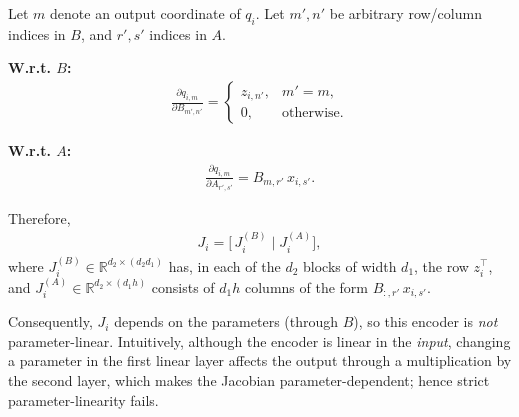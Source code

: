 Let $m$ denote an output coordinate of $q_i$. Let $m',n'$ be arbitrary row/column indices in $B$, and $r',s'$ indices in $A$.

\textbf{W.r.t. $B$:}
\begin{align}
\frac{\partial q_{i,m}}{\partial B_{m',n'}} 
= \begin{cases} z_{i,n'}, & m' = m, \\ 0, & \text{otherwise.} \end{cases}
\end{align}

\textbf{W.r.t. $A$:}
\begin{align}
\frac{\partial q_{i,m}}{\partial A_{r',s'}} = B_{m,r'}\,x_{i,s'} .
\end{align}

Therefore,
\begin{align}
J_i = \bigl[\, J^{(B)}_i \;\big|\; J^{(A)}_i \bigr],
\end{align}
where $J^{(B)}_i\in\mathbb{R}^{d_2\times(d_2 d_1)}$ has, in each of the $d_2$ blocks of width $d_1$, the row $z_i^{\!\top}$, and $J^{(A)}_i\in\mathbb{R}^{d_2\times(d_1 h)}$ consists of $d_1 h$ columns of the form $B_{:,r'}\,x_{i,s'}$.

Consequently, $J_i$ depends on the parameters (through $B$), so this encoder is \emph{not} parameter-linear. Intuitively, although the encoder is linear in the \emph{input}, changing a parameter in the first linear layer affects the output through a multiplication by the second layer, which makes the Jacobian parameter-dependent; hence strict parameter-linearity fails.

